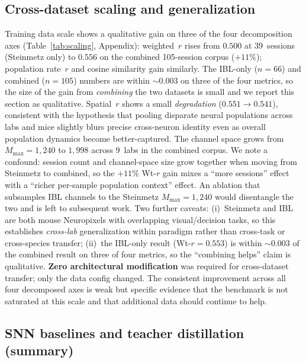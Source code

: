 \documentclass{article}
\begin{document}

\subsection{Cross-dataset scaling and generalization}
\label{sec:scaling}

Training data scale shows a qualitative gain on three of the four
decomposition axes (Table~\ref{tab:scaling}, Appendix): weighted~$r$
rises from $0.500$ at 39~sessions (Steinmetz only) to $0.556$ on the
combined 105-session corpus ($+11\%$); population rate~$r$ and cosine
similarity gain similarly.  The IBL-only ($n{=}66$) and combined
($n{=}105$) numbers are within $\sim 0.003$ on three of the four
metrics, so the size of the gain from \emph{combining} the two
datasets is small and we report this section as qualitative.  Spatial~$r$ shows a small \emph{degradation}
($0.551 \to 0.541$), consistent with the hypothesis that pooling
disparate neural populations across labs and mice slightly blurs
precise cross-neuron identity even as overall population dynamics
become better-captured.  The channel space grows from
$M_\mathrm{max}{=}1{,}240$ to $1{,}998$ across 9~labs in the
combined corpus.  We note a confound: session count and channel-space
size grow together when moving from Steinmetz to combined, so the
$+11\%$ Wt-$r$ gain mixes a ``more sessions'' effect with a ``richer
per-sample population context'' effect.  An ablation that subsamples
IBL channels to the Steinmetz $M_\mathrm{max}{=}1{,}240$ would
disentangle the two and is left to subsequent work.  Two further
caveats: (i)~Steinmetz and IBL are both mouse Neuropixels with
overlapping visual/decision tasks, so this establishes
\emph{cross-lab} generalization within paradigm rather than
cross-task or cross-species transfer; (ii)~the IBL-only result
(Wt-$r{=}0.553$) is within $\sim 0.003$ of the combined result on
three of four metrics, so the ``combining helps'' claim is qualitative.
\textbf{Zero architectural modification} was required for
cross-dataset transfer; only the data config changed.  The consistent
improvement across all four decomposed axes is weak but specific
evidence that the benchmark is not saturated at this scale and that
additional data should continue to help.

\subsection{SNN baselines and teacher distillation (summary)}
\label{sec:snn-summary}
\end{document}
